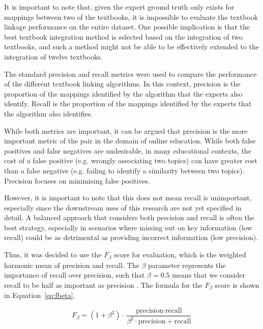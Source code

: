 \documentclass[twocolumn]{article}
\begin{document}
It is important to note that, given the expert ground truth only exists for mappings between two of the textbooks, it is impossible to evaluate the textbook linkage performance on the entire dataset. One possible implication is that the best textbook integration method is selected based on the integration of two textbooks, and such a method might not be able to be effectively extended to the integration of twelve textbooks.

The standard precision and recall metrics were used to compare the performance of the different textbook linking algorithms. In this context, precision is the proportion of the mappings identified by the algorithm that the experts also identify. Recall is the proportion of the mappings identified by the experts that the algorithm also identifies.

While both metrics are important, it can be argued that precision is the more important metric of the pair in the domain of online education. While both false positives and false negatives are undesirable, in many educational contexts, the cost of a false positive (e.g. wrongly associating two topics) can have greater cost than a false negative (e.g. failing to identify a similarity between two topics). Precision focuses on minimising false positives.

However, it is important to note that this does not mean recall is unimportant, especially since the downstream uses of this research are not yet specified in detail. A balanced approach that considers both precision and recall is often the best strategy, especially in scenarios where missing out on key information (low recall) could be as detrimental as providing incorrect information (low precision). 

Thus, it was decided to use the $F_\beta$ score for evaluation, which is the weighted harmonic mean of precision and recall. The $\beta$ parameter represents the importance of recall over precision, such that $\beta=0.5$ means that we consider recall to be half as important as precision \cite{rijsbergen1979}. The formula for the $F_\beta$ score is shown in Equation~\ref{eq:fbeta}.

\begin{equation}\label{eq:fbeta}
F_\beta = (1 + \beta^2)\cdot\frac{\text{precision}\cdot\text{recall}}{\beta^2\cdot\text{precision}+\text{recall}}
\end{equation}
\end{document}
